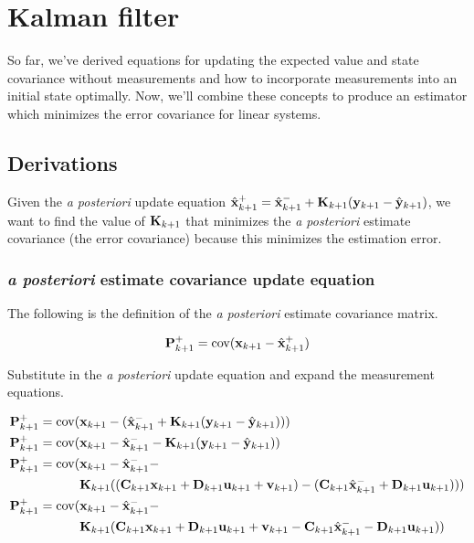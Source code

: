\section{Kalman filter}

So far, we've derived equations for updating the expected value and state
covariance without measurements and how to incorporate measurements into an
initial \gls{state} optimally. Now, we'll combine these concepts to produce an
estimator which minimizes the error covariance for linear \glspl{system}.

\subsection{Derivations}

Given the \textit{a posteriori} update equation
$\hat{\mathbf{x}}_{k+1}^+ = \hat{\mathbf{x}}_{k+1}^- + \mathbf{K}_{k+1}(\mathbf{y}_{k+1} -
\hat{\mathbf{y}}_{k+1})$, we want to find the value of $\mathbf{K}_{k+1}$ that
minimizes the \textit{a posteriori} estimate covariance (the error covariance)
because this minimizes the estimation error.

\subsubsection{\textit{a posteriori} estimate covariance update equation}

The following is the definition of the \textit{a posteriori} estimate covariance
matrix.

\begin{equation*}
  \mathbf{P}_{k+1}^+ = \operatorname{cov}(\mathbf{x}_{k+1} - \hat{\mathbf{x}}_{k+1}^+)
\end{equation*}

Substitute in the \textit{a posteriori} update equation and expand the
measurement equations.

\begin{align*}
  \mathbf{P}_{k+1}^+ = \operatorname{cov}(&\mathbf{x}_{k+1} - (\hat{\mathbf{x}}_{k+1}^- +
    \mathbf{K}_{k+1}(\mathbf{y}_{k+1} - \hat{\mathbf{y}}_{k+1}))) \\
  \mathbf{P}_{k+1}^+ = \operatorname{cov}(&\mathbf{x}_{k+1} - \hat{\mathbf{x}}_{k+1}^- -
    \mathbf{K}_{k+1}(\mathbf{y}_{k+1} - \hat{\mathbf{y}}_{k+1})) \\
  \mathbf{P}_{k+1}^+ = \operatorname{cov}(&\mathbf{x}_{k+1} - \hat{\mathbf{x}}_{k+1}^- - \\
    &\mathbf{K}_{k+1}((\mathbf{C}_{k+1} \mathbf{x}_{k+1} + \mathbf{D}_{k+1} \mathbf{u}_{k+1} +
      \mathbf{v}_{k+1}) - (\mathbf{C}_{k+1} \hat{\mathbf{x}}_{k+1}^- +
      \mathbf{D}_{k+1}\mathbf{u}_{k+1}))) \\
  \mathbf{P}_{k+1}^+ = \operatorname{cov}(&\mathbf{x}_{k+1} - \hat{\mathbf{x}}_{k+1}^- - \\
    &\mathbf{K}_{k+1}(\mathbf{C}_{k+1} \mathbf{x}_{k+1} + \mathbf{D}_{k+1} \mathbf{u}_{k+1} +
      \mathbf{v}_{k+1} - \mathbf{C}_{k+1} \hat{\mathbf{x}}_{k+1}^- -
      \mathbf{D}_{k+1}\mathbf{u}_{k+1}))
\end{align*}

